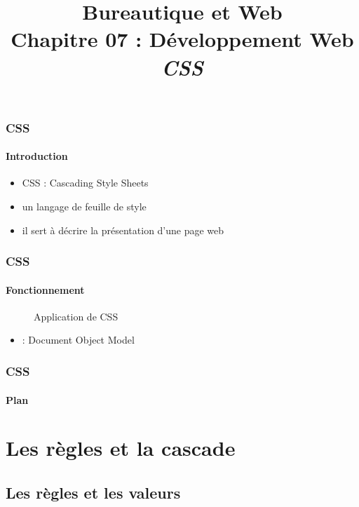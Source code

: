\documentclass[xcolor=table]{beamer}
\title[BWEB : 07- CSS] %
{Bureautique et Web \\Chapitre 07 : Développement Web\\ \slshape\small  CSS}
\begin{document}
	
\begin{frame}
\frametitle{CSS}
\framesubtitle{Introduction}

\begin{itemize}
	\item CSS : Cascading Style Sheets
	\item un langage de feuille de style 
	\item il sert à décrire la présentation d'une page web
\end{itemize}

\end{frame}

\begin{frame}
\frametitle{CSS}
\framesubtitle{Fonctionnement}

\begin{figure}
	\centering
	\caption{Application de CSS \cite{mdn}}
\end{figure}
\begin{itemize}
	\item {} : Document Object Model
\end{itemize}

\end{frame}


\begin{frame}
\frametitle{CSS}
\framesubtitle{Plan}

\begin{multicols}{2}
\tableofcontents
\end{multicols}
\end{frame}

\section{Les règles et la cascade}

\subsection{Les règles et les valeurs}
\end{document}
